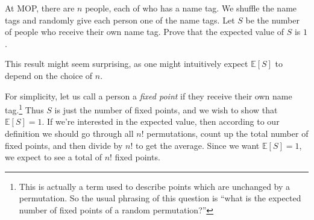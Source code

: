 \documentclass[11pt]{scrartcl}
\newcommand\EE{\mathbb E}
\begin{document}
\begin{example}
  At MOP, there are $n$ people, each of who has a name tag.
  We shuffle the name tags and randomly give each person one of the name tags.
  Let $S$ be the number of people who receive their own name tag.
  Prove that the expected value of $S$ is $1$.
\end{example}

This result might seem surprising, as one might intuitively expect $\EE[S]$ to depend on the choice of $n$.

For simplicity, let us call a person a \emph{fixed point} if they receive their
own name tag.\footnote{This is actually a term used to describe points which are unchanged by a permutation.
So the usual phrasing of this question is ``what is the expected number of fixed
points of a random permutation?''}
Thus $S$ is just the number of fixed points, and we wish to show that $\EE[S]=1$.
If we're interested in the expected value,
then according to our definition we should go through all $n!$ permutations,
count up the total number of fixed points, and then divide by $n!$ to get the average.
Since we want $\EE[S] = 1$, we expect to see a total of $n!$ fixed points.
\end{document}

